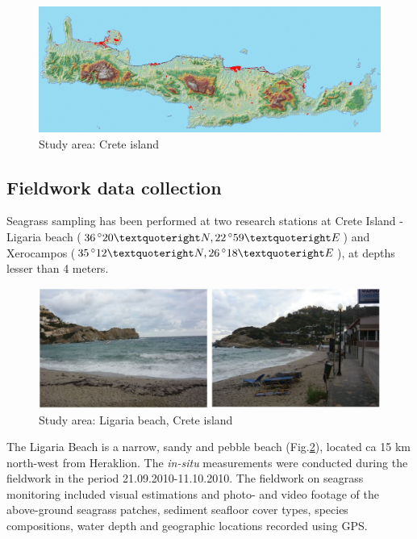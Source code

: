 \documentclass[11pt]{article}
\begin{document}
\begin{figure}[H]
	\centering
	\includegraphics[scale=0.10]{Fig-16.jpg}
	\caption{Study area: Crete island}
	\label{fig:3.1}
\end{figure}

\subsection{Fieldwork data collection}
Seagrass sampling has been performed at two research stations at Crete Island - Ligaria beach
($36\,^{\circ}20\textquoteright N, 22\,^{\circ}59\textquoteright E$) and Xerocampos ($35\,^{\circ}12\textquoteright N, 26\,^{\circ}18\textquoteright E$), at depths lesser than 4 meters. 

\begin{figure}[H]
	\centering
	\includegraphics[scale=0.25]{Fig-17.jpg}
	\caption{Study area: Ligaria beach, Crete island}
	\label{fig:3.2}
\end{figure}

The Ligaria Beach is a narrow, sandy and pebble beach (Fig.\ref{fig:3.2}), located ca 15 km north-west from Heraklion.
The \textit{in-situ} measurements were conducted during the fieldwork in the period 21.09.2010-11.10.2010.
The fieldwork on seagrass monitoring included visual estimations and photo- and video footage of the
above-ground seagrass patches, sediment seafloor cover types, species compositions, water depth and
geographic locations recorded using \ac{GPS}.
\end{document}
